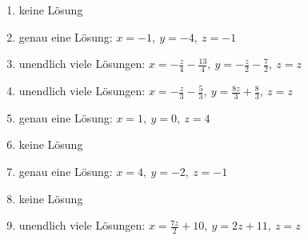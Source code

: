 \begin{Answer}[ref=LGS_A2]
    \begin{enumerate}[label=\alph*)]
        \item keine Lösung%
        \item genau eine Lösung: \(x=-1,\ y=-4,\ z=-1\)%
        \item unendlich viele Lösungen: \(x=-\frac{z}{4}-\frac{13}{4},\ y=-\frac{z}{2}-\frac{7}{2},\ z=z\)%

        \item unendlich viele Lösungen: \(x=-\frac{z}{3}-\frac{5}{3},\ y=\frac{8z}{3}+\frac{8}{3},\ z=z\)%
        \item genau eine Lösung: \(x=1,\ y=0,\ z=4\)%
        \item keine Lösung%

        \item genau eine Lösung: \(x=4,\ y=-2,\ z=-1\)%
        \item keine Lösung%
        \item unendlich viele Lösungen: \(x=\frac{7z}{2}+10,\ y=2z+11,\ z=z\)%
    \end{enumerate}
\end{Answer}
